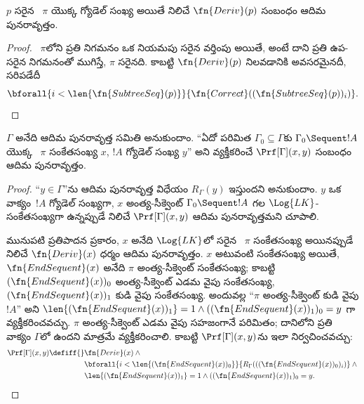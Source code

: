 \documentclass[../../../include/open-logic-section]{subfiles}
\begin{document}
\begin{prop}
  $p$ సరైన ~$\pi$ యొక్క గ్యోడెల్ సంఖ్య
  అయితే నిలిచే $\fn{Deriv}(p)$ సంబంధం ఆదిమ పునరావృత్తం.
\end{prop}

\begin{proof}
  ~$\pi$లోని ప్రతి నిగమనం ఒక
  నియమపు సరైన వర్తింపు అయితే, అంటే దాని ప్రతి ఉప-
  సరైన నిగమనంతో ముగిస్తే, $\pi$ సరైనది. కాబట్టి $\fn{Deriv}(p)$ నిలవడానికి
  అవసరమైనదీ, సరిపడేదీ
  \[
  \bforall{i<\len{\fn{SubtreeSeq}(p)}}{\fn{Correct}((\fn{SubtreeSeq}(p))_i)}.
  \]
\end{proof}


\begin{prop}
$\Gamma$ అనేది  ఆదిమ పునరావృత్త సమితి
అనుకుందాం. ``ఏదో పరిమిత $\Gamma_0\subseteq\Gamma$కు
$\Gamma_0\Sequent !A$ యొక్క ~$\pi$
సంకేతసంఖ్య $x$, $!A$ గ్యోడెల్ సంఖ్య $y$'' అని వ్యక్తీకరించే
$\Prf[\Gamma](x,y)$ సంబంధం ఆదిమ పునరావృత్తం.
\end{prop}

\begin{proof}
``$y\in\Gamma$''ను ఆదిమ పునరావృత్త విధేయం $R_\Gamma(y)$ ఇస్తుందని
అనుకుందాం. $y$ ఒక వాక్యం~$!A$ గ్యోడెల్ సంఖ్యగా, $x$ అంత్య-సీక్వెంట్
$\Gamma_0\Sequent !A$ గల $\Log{LK}$-
సంకేతసంఖ్యగా ఉన్నప్పుడే నిలిచే $\Prf[\Gamma](x,y)$ ఆదిమ పునరావృత్తమని
చూపాలి.

మునుపటి ప్రతిపాదన ప్రకారం, $x$ అనేది $\Log{LK}$లో సరైన
~$\pi$ సంకేతసంఖ్య అయినప్పుడే నిలిచే
$\fn{Deriv}(x)$ ధర్మం ఆదిమ పునరావృత్తం. $x$ అటువంటి సంకేతసంఖ్య అయితే,
$\fn{EndSequent}(x)$ అనేది $\pi$ అంత్య-సీక్వెంట్ సంకేతసంఖ్య;
కాబట్టి $(\fn{EndSequent}(x))_0$ అంత్య-సీక్వెంట్ ఎడమ వైపు సంకేతసంఖ్య,
$(\fn{EndSequent}(x))_1$ కుడి వైపు సంకేతసంఖ్య. అందువల్ల ``$\pi$
అంత్య-సీక్వెంట్ కుడి వైపు $!A$'' అని
$\len{(\fn{EndSequent}(x))_1}=1\land((\fn{EndSequent}(x))_1)_0=y$
గా వ్యక్తీకరించవచ్చు.
$\pi$ అంత్య-సీక్వెంట్ ఎడమ వైపు సహజంగానే పరిమితం; దానిలోని ప్రతి వాక్యం
$\Gamma$లో ఉందని మాత్రమే వ్యక్తీకరించాలి. కాబట్టి $\Prf[\Gamma](x,y)$ను
ఇలా నిర్వచించవచ్చు:
\begin{align*}
\Prf[\Gamma](x,y)\defiff{}&
\fn{Deriv}(x)\land{}\\
&\bforall{i<
  \len{(\fn{EndSequent}(x))_0}}{R_\Gamma(((\fn{EndSequent}(x))_0)_i)}\land{}\\
&\len{(\fn{EndSequent}(x))_1}=1\land((\fn{EndSequent}(x))_1)_0=y.
\end{align*}
\end{proof}
\end{document}
